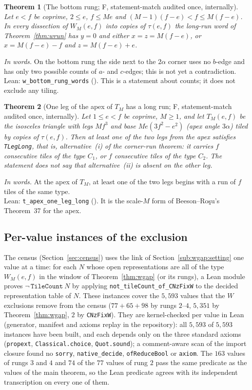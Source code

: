 \documentclass[11pt,reqno]{amsart}
\theoremstyle{plain}
\newtheorem{theorem}{Theorem}[section]
\theoremstyle{definition}
\newcommand{\sF}{\textup{\textsf{F}}}
\begin{document}
\begin{theorem}[The bottom rung; \sF, statement-match audited once, internally]\label{thm:wbottom}
Let $e<f$ be coprime, $2\le e$, $f\le Me$ and $(M-1)(f-e)<f\le M(f-e)$. In every dissection of $W_M(e,f)$ into
copies of $\tau(e,f)$ the long-run word of Theorem~\ref{thm:wrun} has $y=0$ and either $x=z=M(f-e)$, or
$x=M(f-e)-f$ and $z=M(f-e)+e$.
\end{theorem}
\noindent\emph{In words.} On the bottom rung the side next to the $2\alpha$ corner uses no $b$-edge and has only two possible
counts of $a$- and $c$-edges; this is not yet a contradiction.\\
\noindent Lean: \texttt{w\_bottom\_rung\_words} (). This is a statement about counts; it
does not exclude any tiling.

\begin{theorem}[One leg of the apex of $T_M$ has a long run; \sF, statement-match audited once, internally]\label{thm:tapex}
Let $1\le e<f$ be coprime, $M\ge1$, and let $T_M(e,f)$ be the isosceles triangle with legs $Mf^3$ and base
$Me(3f^2-e^2)$ (apex angle $3\alpha$) tiled by copies of $\tau(e,f)$. Then at least one of the two legs from the
apex satisfies \texttt{TLegLong}, that is, alternative~(i) of the corner-run theorem: it carries $f$ consecutive
tiles of the type $C_1$, or $f$ consecutive tiles of the type $C_2$. The statement does not say that alternative~(ii) is absent on the other leg.
\end{theorem}
\noindent\emph{In words.} At the apex of $T_M$, at least one of the two legs begins with a run of $f$ tiles of the same type.\\
\noindent Lean: \texttt{t\_apex\_one\_leg\_long} (). It is the scale-$M$ form of
Beeson--Ro\c{s}u's Theorem~37 for the apex.

\subsection{Per-value instances of the exclusion}\label{sub:wgap:light}
The census (Section~\ref{sec:census}) uses the link of Section~\ref{sub:wgap:setting} one value at a time: for each
$N$ whose open representations are all of the type $W_M(e,f)$ in the window of Theorem~\ref{thm:wgap} (or its rungs), a
Lean module proves $\neg\,\texttt{TileCount}\ N$ by applying \texttt{not\_tileCount\_of\_CNzFixW} to the decided
representation table of $N$. These instances cover the $5{,}593$ values that the $W$ exclusions remove from the census
($77+65+98$ by rungs $2$--$4$, $5{,}351$ by Theorem~\ref{thm:wgap}, $2$ by \texttt{CNzFixW}). They are kernel-checked per
value in Lean (generator, manifest and axioms replay in the repository): all $5{,}593$ of $5{,}593$ instances have been
built, and each depends only on the three standard axioms (\texttt{propext}, \texttt{Classical.choice},
\texttt{Quot.sound}); a comment-aware scan of the import closure found no \texttt{sorry}, \texttt{native\_decide},
\texttt{ofReduceBool} or \texttt{axiom}. The $163$ values of rungs $3$ and $4$ and $74$ of the $77$ values of rung $2$
pass the same predicate as the values of the main theorem, so the Lean predicate agrees with its independent
transcription on every one of them.
\end{document}
